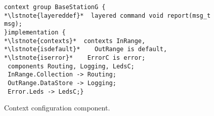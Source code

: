 \begin{figure}[!tb]
\begin{lstlisting}[style=conescframe]
context group BaseStationG {
*\lstnote{layereddef}*  layered command void report(msg_t msg);
}implementation {
*\lstnote{contexts}*  contexts InRange,
*\lstnote{isdefault}*    OutRange is default,
*\lstnote{iserror}*    ErrorC is error;
 components Routing, Logging, LedsC;
 InRange.Collection -> Routing;
 OutRange.DataStore -> Logging;
 Error.Leds -> LedsC;}
\end{lstlisting}
\vspace{-4mm}
\caption{Context configuration component.}
  \label{fig:ccc}
\vspace{-2mm}
\end{figure}